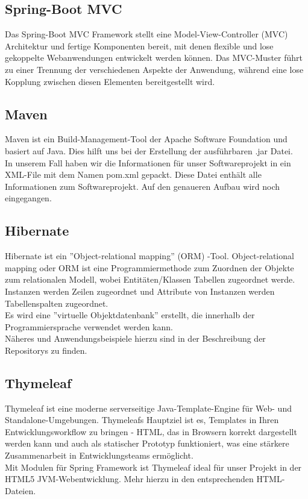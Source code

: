 \documentclass[12pt,a4paper]{article}
\begin{document}
\subsection{Spring-Boot MVC}
Das Spring-Boot MVC Framework stellt eine Model-View-Controller (MVC) Architektur und fertige Komponenten bereit, mit denen flexible und lose gekoppelte Webanwendungen entwickelt werden können. Das MVC-Muster führt zu einer Trennung der verschiedenen Aspekte der Anwendung, während eine lose Kopplung zwischen diesen Elementen bereitgestellt wird. 


\subsection{Maven}
Maven ist ein Build-Management-Tool der Apache Software Foundation und basiert auf Java. Dies hilft uns bei der Erstellung der ausführbaren .jar Datei.\\
In unserem Fall haben wir die Informationen für unser Softwareprojekt in ein XML-File mit dem Namen pom.xml gepackt. Diese Datei enthält alle Informationen zum Softwareprojekt. Auf den genaueren Aufbau wird noch eingegangen.


\subsection{Hibernate}
Hibernate ist ein ''Object-relational mapping'' (ORM) -Tool. Object-relational mapping oder ORM ist eine Programmiermethode zum Zuordnen der Objekte zum relationalen Modell, wobei Entitäten/Klassen Tabellen zugeordnet werde. Instanzen werden Zeilen zugeordnet und Attribute von Instanzen werden Tabellenspalten zugeordnet.\\
Es wird eine ''virtuelle Objektdatenbank'' erstellt, die innerhalb der Programmiersprache verwendet werden kann.\\
Näheres und Anwendungsbeispiele hierzu sind in der Beschreibung der Repositorys zu finden.


\subsection{Thymeleaf}
Thymeleaf ist eine moderne serverseitige Java-Template-Engine für Web- und Standalone-Umgebungen. Thymeleafs Hauptziel ist es, Templates in Ihren Entwicklungsworkflow zu bringen - HTML, das in Browsern korrekt dargestellt werden kann und auch als statischer Prototyp funktioniert, was eine stärkere Zusammenarbeit in Entwicklungsteams ermöglicht.\\
Mit Modulen für Spring Framework ist Thymeleaf ideal für unser Projekt in der HTML5 JVM-Webentwicklung. Mehr hierzu in den entsprechenden HTML-Dateien.
\end{document}
